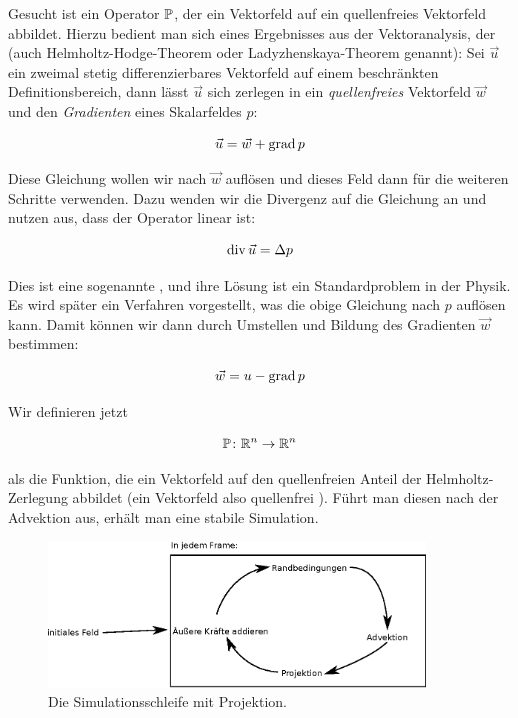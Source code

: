Gesucht ist ein Operator $\mathbb{P}$, der ein Vektorfeld auf ein
quellenfreies Vektorfeld abbildet. Hierzu bedient man sich eines Ergebnisses aus
der Vektoranalysis, der  (auch
Helmholtz-Hodge-Theorem oder Ladyzhenskaya-Theorem genannt): Sei $\vec{u}$ ein
zweimal stetig differenzierbares Vektorfeld auf
einem beschränkten Definitionsbereich, dann lässt $\vec{u}$ sich zerlegen in ein
\emph{quellenfreies} Vektorfeld $\vec{w}$ und den \emph{Gradienten} eines
Skalarfeldes $p$:

\begin{equation}
\vec{u} = \vec{w} + \operatorname*{grad} p
\end{equation}

Diese Gleichung wollen wir nach $\vec{w}$ auflösen und dieses Feld dann für die
weiteren Schritte verwenden. Dazu wenden wir die Divergenz auf die Gleichung an
und nutzen aus, dass der Operator linear ist:

\begin{equation}
\operatorname*{div} \vec{u} = \Delta p
\end{equation}

Dies ist eine sogenannte , und ihre Lösung ist
ein Standardproblem in der Physik. Es wird später ein Verfahren vorgestellt, was
die obige Gleichung nach $p$ auflösen kann. Damit können wir dann durch
Umstellen und Bildung des Gradienten $\vec{w}$ bestimmen:

\begin{equation}
\vec{w} = u - \operatorname*{grad} p
\end{equation}

Wir definieren jetzt

\begin{equation}
\mathbb{P} \colon \mathbb{R}^n \to \mathbb{R}^n
\end{equation}

als die Funktion, die ein Vektorfeld auf den quellenfreien Anteil der
Helmholtz-Zerlegung abbildet (ein Vektorfeld also quellenfrei
). Führt man diesen nach der Advektion aus, erhält man eine
stabile Simulation.

\begin{figure}[ht]
\includegraphics[width=10cm]{images/stam_loop_with_projection}
\caption{Die Simulationsschleife mit Projektion.}
\end{figure}

